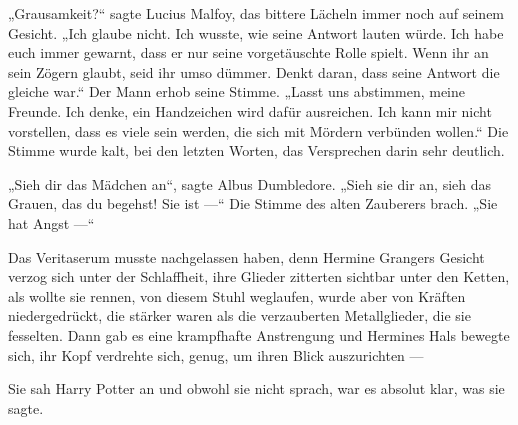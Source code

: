„Grausamkeit?“ sagte Lucius Malfoy, das bittere Lächeln immer noch auf seinem Gesicht.
„Ich glaube nicht. Ich wusste, wie seine Antwort lauten würde. Ich habe euch immer gewarnt, dass er nur seine vorgetäuschte Rolle spielt. Wenn ihr an sein Zögern glaubt, seid ihr umso dümmer. Denkt daran, dass seine Antwort die gleiche war.“ Der Mann erhob seine Stimme.
„Lasst uns abstimmen, meine Freunde. Ich denke, ein Handzeichen wird dafür ausreichen. Ich kann mir nicht vorstellen, dass es viele sein werden, die sich mit Mördern verbünden wollen.“ Die Stimme wurde kalt, bei den letzten Worten, das Versprechen darin sehr deutlich.

„Sieh dir das Mädchen an“, sagte Albus Dumbledore.
„Sieh sie dir an, sieh das Grauen, das du begehst! Sie ist —“ Die Stimme des alten Zauberers brach.
„Sie hat Angst —“

Das Veritaserum musste nachgelassen haben, denn Hermine Grangers Gesicht verzog sich unter der Schlaffheit, ihre Glieder zitterten sichtbar unter den Ketten, als wollte sie rennen, von diesem Stuhl weglaufen, wurde aber von Kräften niedergedrückt, die stärker waren als die verzauberten Metallglieder, die sie fesselten. Dann gab es eine krampfhafte Anstrengung und Hermines Hals bewegte sich, ihr Kopf verdrehte sich, genug, um ihren Blick auszurichten —

Sie sah Harry Potter an und obwohl sie nicht sprach, war es absolut klar, was sie sagte.

